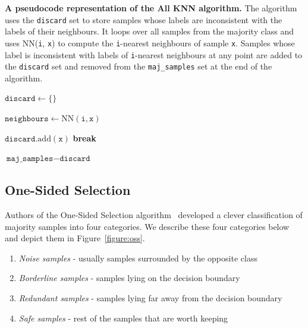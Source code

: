 \begin{algorithm}
    \caption{
        \textbf{A pseudocode representation of the All KNN algorithm.} The algorithm uses the
        \texttt{discard} set to store samples whose labels are inconsistent with the labels of
        their neighbours. It loops over all samples from the majority class and uses
        \textrm{NN}(\texttt{i}, \texttt{x}) to compute the \texttt{i}-nearest neighbours of sample
        \texttt{x}. Samples whose label is inconsistent with labels of \texttt{i}-nearest
        neighbours at any point are added to the \texttt{discard} set and removed from the
        \texttt{maj\_samples} set at the end of the algorithm.
    }
    \label{algorithm:all-knn}

    \begin{algorithmic}
            \State $\texttt{discard} \gets \{\}$

                    \State $\texttt{neighbours} \gets \textrm{NN}(\texttt{i}, \texttt{x})$

                        \State $\texttt{discard}.\textrm{add}(\texttt{x})$
                        \State \textbf{break}
                    \EndIf
                \EndFor
            \EndFor

            \State \Return $\texttt{maj\_samples} - \texttt{discard}$
        \EndFunction
    \end{algorithmic}
\end{algorithm}


\subsection{One-Sided Selection}
\label{subsection:one-side-selection}

Authors of the One-Sided Selection algorithm~\cite{one-sided-selection} developed a clever
classification of majority samples into four categories. We describe these four categories below
and depict them in Figure~\ref{figure:oss}.

\begin{enumerate}
    \item \emph{Noise samples} - usually samples surrounded by the opposite class
    \item \emph{Borderline samples} - samples lying on the decision boundary
    \item \emph{Redundant samples} - samples lying far away from the decision boundary
    \item \emph{Safe samples} - rest of the samples that are worth keeping
\end{enumerate}

